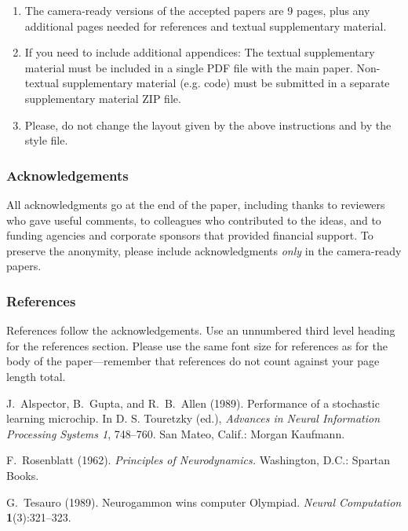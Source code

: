 \documentclass[twoside]{article}
\begin{document}
\begin{enumerate}

  \item The camera-ready versions of the accepted papers are 9
        pages, plus any additional pages needed for references and textual supplementary material.

  \item If you need to include additional appendices: The textual supplementary material must be included
        in a single PDF file with the main paper. Non-textual supplementary material (e.g. code) must be submitted
        in a separate supplementary material ZIP file.

  \item Please, do not change the layout given by the above
        instructions and by the style file.

\end{enumerate}

\subsubsection*{Acknowledgements}
All acknowledgments go at the end of the paper, including thanks to reviewers who gave useful comments, to colleagues who contributed to the ideas, and to funding agencies and corporate sponsors that provided financial support.
To preserve the anonymity, please include acknowledgments \emph{only} in the camera-ready papers.


\subsubsection*{References}

References follow the acknowledgements.  Use an unnumbered third level
heading for the references section.  Please use the same font
size for references as for the body of the paper---remember that
references do not count against your page length total.

\begin{thebibliography}{}
  \setlength{\itemindent}{-\leftmargin}
  \makeatletter\renewcommand{\@biblabel}[1]{}\makeatother
  \bibitem{} J.~Alspector, B.~Gupta, and R.~B.~Allen (1989).
  \newblock Performance of a stochastic learning microchip.
  \newblock In D. S. Touretzky (ed.),
  \textit{Advances in Neural Information Processing Systems 1}, 748--760.
  San Mateo, Calif.: Morgan Kaufmann.

  \bibitem{} F.~Rosenblatt (1962).
  \newblock \textit{Principles of Neurodynamics.}
  \newblock Washington, D.C.: Spartan Books.

  \bibitem{} G.~Tesauro (1989).
  \newblock Neurogammon wins computer Olympiad.
  \newblock \textit{Neural Computation} \textbf{1}(3):321--323.
\end{thebibliography}
\end{document}
